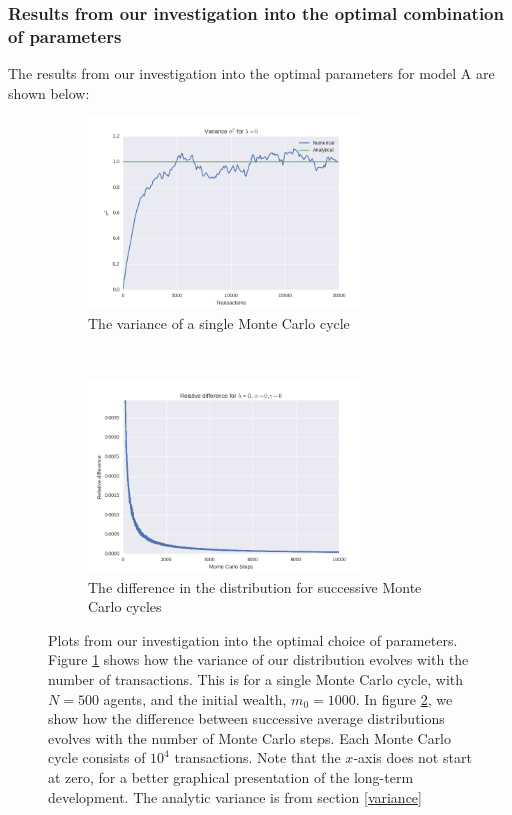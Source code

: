 \documentclass[a4paper, 10pt]{article}
\begin{document}
\subsubsection{Results from our investigation into the optimal combination of parameters}
The results from our investigation into the optimal parameters for model A are shown below:
\begin{figure}[!ht]
    \centering
    \begin{subfigure}[H!]{0.5\textwidth}
        \centering
        \includegraphics[height=2.0in]{varLamb0.png}
        \caption{The variance of a single Monte Carlo cycle}\label{fig:ModelA_Var}
    \end{subfigure}%
    ~ 
    \begin{subfigure}[H!]{0.5\textwidth}
        \centering
        \includegraphics[height=2.0in]{relDiffL0A0G0.png}
        \caption{The difference in the distribution for successive Monte Carlo cycles}\label{fig:ModelA_MC_steps}
    \end{subfigure}
    \caption{Plots from our investigation into the optimal choice of parameters. Figure \ref{fig:ModelA_Var} shows how the variance of our distribution evolves with the number of transactions. This is for a single Monte Carlo cycle, with $N=500$ agents, and the initial wealth, $m_0=1000$. In figure \ref{fig:ModelA_MC_steps}, we show how the difference between successive average distributions evolves with the number of Monte Carlo steps. Each Monte Carlo cycle consists of $10^4$ transactions. Note that the $x$-axis does not start at zero, for a better graphical presentation of the long-term development. The analytic variance is from section \ref{variance}}\label{fig:ModelA}
\end{figure}
\end{document}
